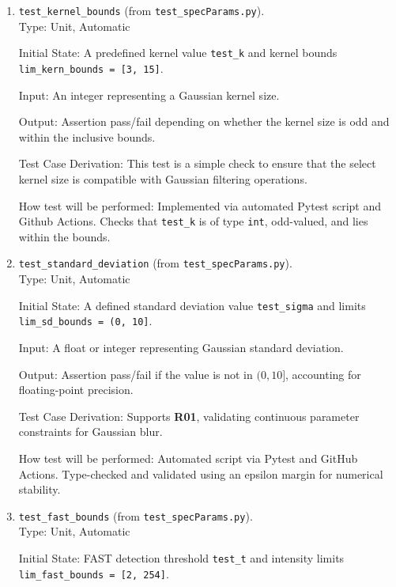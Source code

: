 \documentclass[12pt, titlepage]{article}
\begin{document}
\begin{enumerate}
  \item \texttt{test\_kernel\_bounds} \textnormal{(from \texttt{test\_specParams.py})}. \\

  Type: Unit, Automatic

  Initial State: A predefined kernel value \texttt{test\_k} and kernel bounds \texttt{lim\_kern\_bounds = [3, 15]}.

  Input: An integer representing a Gaussian kernel size.

  Output: Assertion pass/fail depending on whether the kernel size is odd and within the inclusive bounds.

  Test Case Derivation: This test is a simple check to ensure that the select kernel size is compatible with Gaussian filtering operations.

  How test will be performed: Implemented via automated Pytest script and Github Actions. Checks that \texttt{test\_k} is of type \texttt{int}, odd-valued, and lies within the bounds.

  \item \texttt{test\_standard\_deviation} \textnormal{(from \texttt{test\_specParams.py})}. \\

  Type: Unit, Automatic

  Initial State: A defined standard deviation value \texttt{test\_sigma} and limits \texttt{lim\_sd\_bounds = (0, 10]}.

  Input: A float or integer representing Gaussian standard deviation.

  Output: Assertion pass/fail if the value is not in \((0, 10]\), accounting for floating-point precision.

  Test Case Derivation: Supports \textbf{R01}, validating continuous parameter constraints for Gaussian blur.

  How test will be performed: Automated script via Pytest and GitHub Actions. Type-checked and validated using an epsilon margin for numerical stability.

  \item \texttt{test\_fast\_bounds} \textnormal{(from \texttt{test\_specParams.py})}. \\

  Type: Unit, Automatic

  Initial State: FAST detection threshold \texttt{test\_t} and intensity limits \texttt{lim\_fast\_bounds = [2, 254]}.


\end{enumerate}
\end{document}
